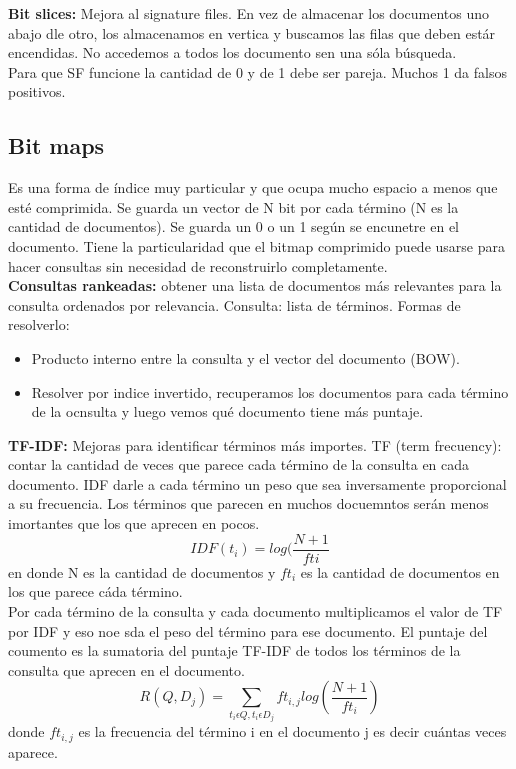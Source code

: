 \documentclass[titlepage,a4paper]{article}
\begin{document}
\textbf{Bit slices: }Mejora al signature files. En vez de almacenar los documentos uno abajo dle otro, los almacenamos en vertica y buscamos las filas que deben estár encendidas. No accedemos a todos los documento sen una sóla búsqueda. \\

Para que SF funcione la cantidad de 0 y de 1 debe ser pareja. Muchos 1 da falsos positivos. \\

\subsection*{Bit maps}

Es una forma de índice muy particular y que ocupa mucho espacio a menos que esté comprimida. Se guarda un vector de N bit por cada término (N es la cantidad de documentos). Se guarda un 0 o un 1 según se encunetre en el documento. Tiene la particularidad que el bitmap comprimido puede usarse para hacer consultas sin necesidad de reconstruirlo completamente. \\

\textbf{Consultas rankeadas:} obtener una lista de documentos más relevantes para la consulta ordenados por relevancia. Consulta: lista de términos. Formas de resolverlo: 
\begin{itemize}
\item Producto interno entre la consulta y el vector del documento (BOW). 
\item Resolver por indice invertido, recuperamos los documentos para cada término de la ocnsulta y luego vemos qué documento tiene más puntaje. 
\end{itemize}

\textbf{TF-IDF:} Mejoras para identificar términos más importes. TF (term frecuency): contar la cantidad de veces que parece cada término de la consulta en cada documento. IDF darle a cada término un peso que sea inversamente proporcional a su frecuencia. Los términos que parecen en muchos docuemntos serán menos imortantes que los que aprecen en pocos. $$IDF(t_i) = log(\frac{N+1}{fti}$$ en donde N es la cantidad de documentos y $ft_i$ es la cantidad de documentos en los que parece cáda término.\\

Por cada término de la consulta y cada documento multiplicamos el valor de TF por IDF y eso noe sda el peso del término para ese documento. El puntaje del coumento es la sumatoria del puntaje TF-IDF de todos los términos de la consulta que aprecen en el documento. $$R(Q, D_j) = \sum_{t_i \epsilon Q, t_i \epsilon D_j} ft_{i,j} log( \frac{N+1}{ft_i}) $$donde $ft_{i,j}$ es la frecuencia del término i en el documento j es decir cuántas veces aparece. \\
\end{document}
